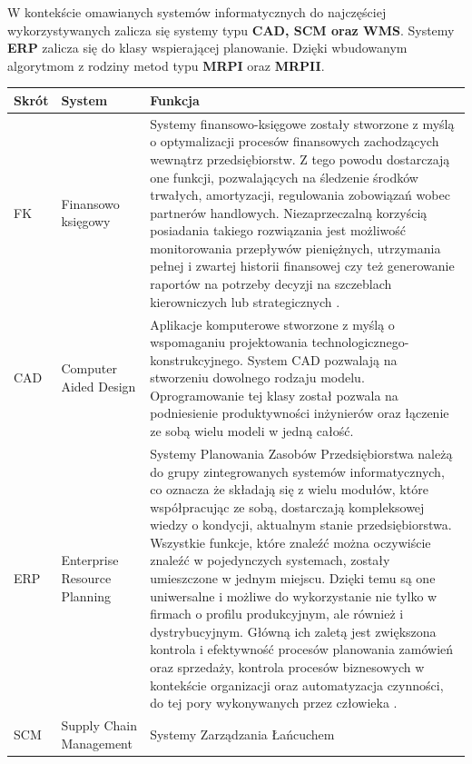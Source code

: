		\pagebreak
		W kontekście omawianych systemów informatycznych do najczęściej wykorzystywanych zalicza się systemy typu
		\textbf{CAD, SCM oraz WMS}. Systemy \textbf{ERP} zalicza się do klasy wspierającej planowanie. Dzięki 
		wbudowanym algorytmom z rodziny metod typu \textbf{MRPI} oraz \textbf{MRPII}.
		\begin{table}[H]
			\centering
			\begin{tabular}{| l | l | p{9.5cm} |}
				\hline				
				\textbf{Skrót} 		& \textbf{System}					& \textbf{Funkcja} \\
				\hline
				FK					& Finansowo księgowy 				& Systemy finansowo-księgowe
				zostały stworzone z myślą o optymalizacji procesów finansowych zachodzących
				wewnątrz przedsiębiorstw. Z tego powodu dostarczają one funkcji, pozwalających
				na śledzenie środków trwałych, amortyzacji, regulowania zobowiązań wobec partnerów
				handlowych. Niezaprzeczalną korzyścią posiadania takiego rozwiązania jest możliwość
				monitorowania przepływów pieniężnych, utrzymania pełnej i zwartej historii finansowej
				czy też generowanie raportów na potrzeby decyzji na szczeblach kierowniczych lub
				strategicznych \cite{fk_system}. 	\\
				\hline
				CAD					& Computer Aided Design				& Aplikacje komputerowe
				stworzone z myślą o wspomaganiu projektowania technologicznego-konstrukcyjnego. System
				CAD pozwalają na stworzeniu dowolnego rodzaju modelu. Oprogramowanie tej klasy 
				został pozwala na podniesienie produktywności inżynierów oraz łączenie ze sobą
				wielu modeli w jedną całość. 		\\
				\hline
				ERP					& Enterprise Resource Planning		& Systemy Planowania Zasobów 
				Przedsiębiorstwa należą do grupy zintegrowanych systemów informatycznych, co oznacza
				że składają się z wielu modułów, które współpracując ze sobą, dostarczają
				kompleksowej wiedzy o kondycji, aktualnym stanie przedsiębiorstwa. Wszystkie funkcje, 
				które znaleźć można oczywiście znaleźć w pojedynczych systemach, zostały umieszczone
				w jednym miejscu. Dzięki temu są one uniwersalne i możliwe do wykorzystanie nie tylko
				w firmach o profilu produkcyjnym, ale również i dystrybucyjnym. Główną ich zaletą jest
				zwiększona kontrola i efektywność procesów planowania zamówień oraz sprzedaży, kontrola
				procesów biznesowych w kontekście organizacji oraz automatyzacja czynności, do tej pory
				wykonywanych przez człowieka \cite{erp_system}.\\
				\hline	
				SCM					& Supply Chain Management			& Systemy Zarządzania Łańcuchem

\end{tabular}
\end{table}
